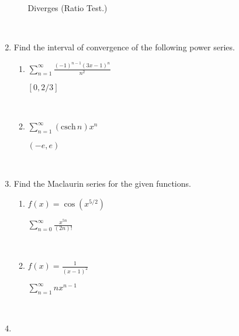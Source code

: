 \documentclass[]{handout}
\begin{document}
\begin{enumerate}[(1)]
\begin{enumerate}
\begin{answer} Diverges (Ratio Test.)
\end{answer}

		\

	\end{enumerate}


	\item Find the interval of convergence of the following power series.

	\begin{enumerate}

		\item $\displaystyle \sum_{n=1}^\infty \frac{(-1)^{n-1}(3x-1)^n}{n^2}$  %

\begin{answer} $[0,2/3]$
\end{answer}

		\

		\item $\displaystyle \sum_{n=1}^\infty (\mbox{csch}\, n) x^n$ %

\begin{answer} $(-e,e)$
\end{answer}

		\

	\end{enumerate}

	\item Find the Maclaurin series for the given functions.

	\begin{enumerate}

		\item $f(x) = \cos(x^{5/2})$

\begin{answer} 
			$\displaystyle \sum_{n=0}^\infty \frac{x^{5n}}{(2n)!}$
\end{answer}

		\

		\item $\displaystyle f(x) = \frac{1}{(x-1)^2}$

\begin{answer} 
		$\displaystyle \sum_{n=1}^\infty n x^{n-1}$
\end{answer}

		\

	\end{enumerate}

	\item \begin{enumerate}


\end{enumerate}
\end{enumerate}
\end{document}
